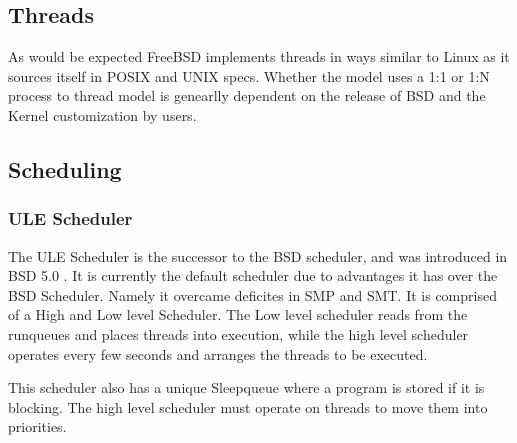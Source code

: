 \documentclass[letterpaper,10pt,notitlepage,fleqn]{article}
\begin{document}
\subsection{Threads}

As would be expected FreeBSD implements threads in ways similar to Linux as it sources
itself in POSIX and UNIX specs. Whether the model uses a 1:1 or 1:N process to thread model
is genearlly dependent on the release of BSD and the Kernel customization by users\cite{BSDThread}. 

\subsection{Scheduling}

\subsubsection{ ULE Scheduler }
The ULE Scheduler is the successor to the BSD scheduler, and was introduced in BSD 5.0 
\cite{BSDProc}. It is currently the default scheduler due to advantages it has over the
BSD Scheduler. Namely it overcame deficites in SMP and SMT. It is comprised of a High 
and Low level Scheduler. The Low level scheduler \cite{ULE} reads from the runqueues and 
places threads into execution, while the high level scheduler operates every few seconds and
arranges the threads to be executed\cite{BSDProc}. 

This scheduler also has a unique Sleepqueue where a program is stored if it is blocking. The 
high level scheduler must operate on threads to move them into priorities.  
\end{document}
